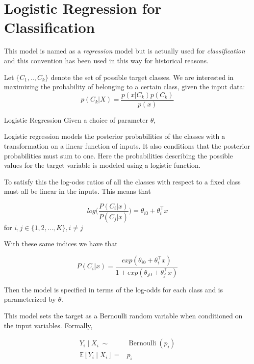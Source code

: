 \section{Logistic Regression for Classification}

This model is named as a \textit{regression} model but is actually used for \textit{classification} and this convention has been used in this way for historical reasons.



Let $\{C_1,..,C_k\}$ denote the set of possible target classes. We are  interested in maximizing the probability of belonging to a certain class, given the input data:
$$p(C_k| X) = \frac{p(x|C_k)p(C_k)}{p(x)} $$

\begin{definition}{Logistic Regression}
	Given a choice of parameter $\theta$, 	
\end{definition}

Logistic regression models the posterior probabilities of the classes with a transformation on a linear function of inputs. It also conditions that the posterior probabilities must sum to one. Here the probabilities describing the possible values for the target variable is modeled using a logistic function.

To satisfy this the log-odss ratios of all the classes with respect to a fixed class must all be linear in the inputs. This means that

$$ log\big( \frac{P(C_i|x)}{P(C_j|x)}\big) = \theta_{i0}  + \theta_i^\intercal x  $$ for $i,j \in \{1,2,...,K\}, i\neq j$ \label{logit-logOddss}

With these same indices we have that

$$ P(C_i|x) = \frac{ exp(\theta_{i0}  + \theta_i^\intercal x)}{1 + exp(\theta_{j0}  + \theta_j^\intercal x)}   $$ 

Then the model is specified in terms of the log-odds for each class and is parameterized by $\theta$.

This model sets the target as a Bernoulli random variable when conditioned on the input variables. Formally,

\begin{equation}
\begin{split}
Y_i \mid X_i \  \sim & \operatorname{Bernoulli}(p_i) \\
\mathbb{E}[Y_i \mid X_i ] = & p_i  
\end{split}
\end{equation}


